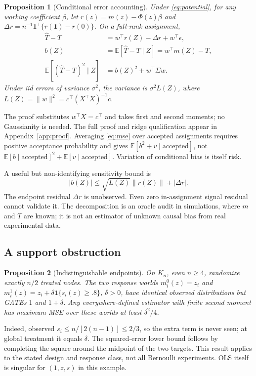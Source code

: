 \documentclass{article}
\newtheorem{proposition}{Proposition}
\newcommand{\E}{\mathbb E}
\newcommand{\one}{\mathbf 1}
\begin{document}
\begin{proposition}[Conditional error accounting]\label{prop:error}
Under \eqref{eq:potential}, for any working coefficient $\beta$, let $r(z)=m(z)-\Phi(z)\beta$ and $\Delta r=n^{-1}\one^\top\{r(\one)-r(0)\}$. On a full-rank assignment,
\begin{align}
\widehat T-T&=w^\top r(Z)-\Delta r+w^\top\epsilon,\label{eq:residual}\\
b(Z)&=\E[\widehat T-T\mid Z]=w^\top m(Z)-T,\nonumber\\
\E[(\widehat T-T)^2\mid Z]&=b(Z)^2+w^\top\Sigma w.\label{eq:mse}
\end{align}
Under iid errors of variance $\sigma^2$, the variance is $\sigma^2L(Z)$, where $L(Z)=\|w\|^2=c^\top(X^\top X)^{-1}c$.
\end{proposition}
The proof substitutes $w^\top X=c^\top$ and takes first and second moments; no Gaussianity is needed. The full proof and ridge qualification appear in Appendix~\ref{app:proof}. Averaging \eqref{eq:mse} over accepted assignments requires positive acceptance probability and gives $\E[b^2+v\mid\mathrm{accepted}]$, not $\E[b\mid\mathrm{accepted}]^2+\E[v\mid\mathrm{accepted}]$. Variation of conditional bias is itself risk.

A useful but non-identifying sensitivity bound is
\begin{equation}\label{eq:bound}
|b(Z)|\leq \sqrt{L(Z)}\|r(Z)\|+|\Delta r|.
\end{equation}
The endpoint residual $\Delta r$ is unobserved. Even zero in-assignment signal residual cannot validate it. The decomposition is an oracle audit in simulations, where $m$ and $T$ are known; it is not an estimator of unknown causal bias from real experimental data.

\subsection{A support obstruction}
\begin{proposition}[Indistinguishable endpoints]\label{prop:support}
On $K_n$, even $n\geq4$, randomize exactly $n/2$ treated nodes. The two response worlds $m_i^0(z)=z_i$ and $m_i^1(z)=z_i+\delta\one\{s_i(z)\geq.8\}$, $\delta>0$, have identical observed distributions but GATEs $1$ and $1+\delta$. Any everywhere-defined estimator with finite second moment has maximum MSE over these worlds at least $\delta^2/4$.
\end{proposition}
Indeed, observed $s_i\leq n/[2(n-1)]\leq2/3$, so the extra term is never seen; at global treatment it equals $\delta$. The squared-error lower bound follows by completing the square around the midpoint of the two targets. This result applies to the stated design and response class, not all Bernoulli experiments. OLS itself is singular for $(1,z,s)$ in this example.
\end{document}

